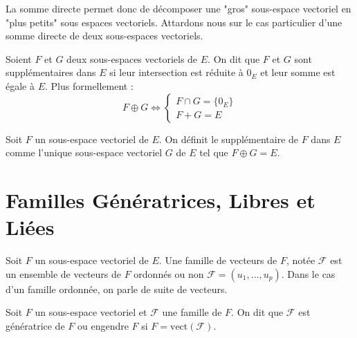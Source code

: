 La somme directe permet donc de décomposer une "gros" sous-espace vectoriel en "plus petits" sous espaces vectoriels. 
Attardons nous sur le cas particulier d'une somme directe de deux sous-espaces vectoriels. 

\begin{remark}
    Soient $F$ et $G$ deux sous-espaces vectoriels de $E$. On dit que $F$ et $G$ sont supplémentaires dans $E$ si 
    leur intersection est réduite à $0_E$ et leur somme est égale à $E$. 
    Plus formellement : 
        \[ F \oplus G \iff 
            \begin{cases}
                F \cap G = \{0_E\} \\ 
                F + G = E 
            \end{cases} \] 
\end{remark}

\begin{definition}[Complémentaire]
    Soit $F$ un sous-espace vectoriel de $E$. On définit le supplémentaire de $F$ dans $E$ comme l'unique 
    sous-espace vectoriel $G$ de $E$ tel que $ F \oplus G = E$. 
\end{definition}


\section{Familles Génératrices, Libres et Liées}

\begin{definition}[Famille]
    Soit $F$ un sous-espace vectoriel de $E$. 
    Une famille de vecteurs de $F$, notée $ \mathcal{F}$ est un ensemble de vecteurs de $F$ ordonnés ou non 
    $ \mathcal{F} = (u_1, \dots, u_p)$. 
    Dans le cas d'un famille ordonnée, on parle de suite de vecteurs.
\end{definition}

\begin{definition}
    Soit $F$ un sous-espace vectoriel et $ \mathcal{F}$ une famille de $F$. 
    On dit que $ \mathcal{F} $ est génératrice de $F$ ou engendre $F$ si $F = \text{vect}(\mathcal{F})$. 
\end{definition}

